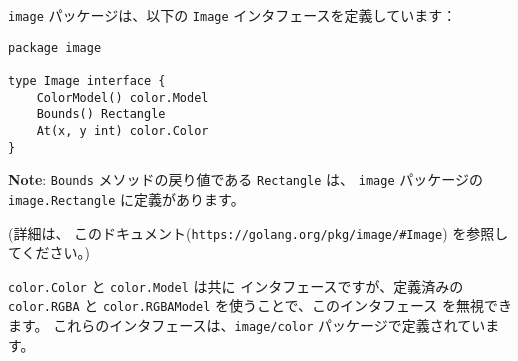 \texttt{image} パッケージは、以下の \texttt{Image} インタフェースを定義しています：

\begin{lstlisting}[numbers=none]
package image

type Image interface {
    ColorModel() color.Model
    Bounds() Rectangle
    At(x, y int) color.Color
}
\end{lstlisting}
\textbf{Note}: \texttt{Bounds} メソッドの戻り値である
\texttt{Rectangle} は、 \texttt{image} パッケージの
\texttt{image.Rectangle} に定義があります。

(詳細は、 このドキュメント(\texttt{https:\//\//golang.org\//pkg\//image\//\#Image}) を参照してください。)

\texttt{color.Color} と \texttt{color.Model} は共に
インタフェースですが、定義済みの \texttt{color.RGBA} と
\texttt{color.RGBAModel} を使うことで、このインタフェース
を無視できます。 これらのインタフェースは、\texttt{image/color}
パッケージで定義されています。